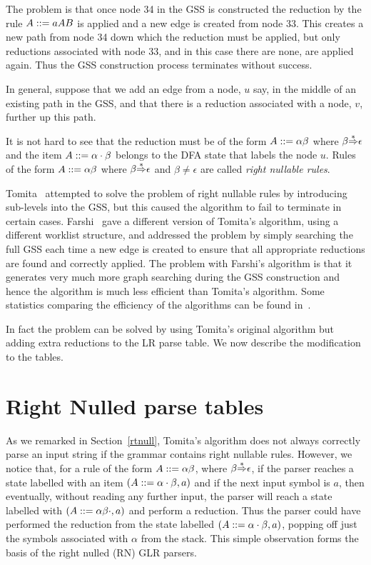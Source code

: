 The problem is that once node 34 in the GSS is constructed the
reduction by the rule $A::= aAB$ is applied and a new edge is created
from node 33. This creates a new path from node 34 down which the
reduction must be applied, but only reductions associated with node
33, and in this case there are none, are applied again. Thus the GSS
construction process terminates without success.


In general, suppose that we add an edge from a node, $u$ say, in 
the middle of an existing path in the GSS, and that there is a 
reduction associated with a node, $v$, further up this path.
\begin{center}
\footnotesize

\end{center}
It is not hard to see that the reduction must be of the form
$A::=\alpha\beta$ where $\beta{\mathop{\Rightarrow}\limits^*}\epsilon$ and the item
$A::=\alpha\cdot\beta$ belongs to the DFA state that labels the node
$u$.
Rules of the form $A::=\alpha\beta$ where $\beta{\mathop{\Rightarrow}\limits^*}\epsilon$ and 
$\beta\not=\epsilon$ are called {\em right nullable rules}.



Tomita~\cite{TOMITA86} attempted to solve the problem of right
nullable rules by introducing 
sub-levels into the GSS, but this caused the algorithm to fail to 
terminate in certain cases. Farshi~\cite{FARSHI91} gave a different
version of Tomita's algorithm, using a different worklist structure,
and addressed the problem by simply searching the full GSS each time a
new edge is created to ensure that all appropriate reductions are
found and correctly applied. The problem with Farshi's algorithm is
that it generates very much more graph searching during the GSS 
construction and hence the algorithm is much less efficient than
Tomita's algorithm. Some statistics comparing the efficiency of the
algorithms can be found in~\cite{AJES04D1}.

In fact the problem can be solved by using Tomita's original algorithm
but adding extra reductions to the LR parse table. We now describe the
modification to the tables.

\section{Right Nulled parse tables}

As we remarked in Section~\ref{rtnull}, Tomita's algorithm does not
always correctly parse an input string if the grammar contains right
nullable rules. However, we notice that, for a rule of the form
$A::=\alpha\beta$, where $\beta{\mathop{\Rightarrow}\limits^*}\epsilon$, if the parser
reaches a state labelled with an item $(A::=\alpha\cdot\beta,a)$ and
if the next input symbol is $a$, then eventually, without reading any
further input, the parser will reach a state labelled with
$(A::=\alpha\beta\cdot,a)$ and perform a reduction. Thus the parser
could have performed the reduction from the state labelled 
$(A::=\alpha\cdot\beta,a)$, popping off just the symbols associated
with $\alpha$ from the stack. This simple observation forms the basis
of the right nulled (RN) GLR parsers.

